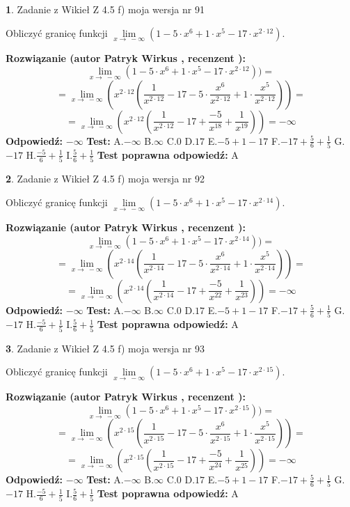 \documentclass[12pt, a4paper]{article}
\theoremstyle{definition} %
\newtheorem{zad}{}
\newcommand{\zadStart}[1]{\begin{zad}#1\newline}
\newcommand{\zadStop}{\end{zad}}
\newcommand{\rozwStart}[2]{\noindent \textbf{Rozwiązanie (autor #1 , recenzent #2): }\newline}
\newcommand{\rozwStop}{\newline}
\newcommand{\odpStart}{\noindent \textbf{Odpowiedź:}\newline}
\newcommand{\odpStop}{\newline}
\newcommand{\testStart}{\noindent \textbf{Test:}\newline}
\newcommand{\testStop}{\newline}
\newcommand{\kluczStart}{\noindent \textbf{Test poprawna odpowiedź:}\newline}
\newcommand{\kluczStop}{\newline}
\begin{document}
\zadStart{Zadanie z Wikieł Z 4.5 f) moja wersja nr 91}



Obliczyć granicę funkcji  $\lim\limits_{x\to\ -\infty}(1 - 5 \cdot x^{6}+1 \cdot x^{5}- 17 \cdot x^{2\cdot12})$.
\zadStop
\rozwStart{Patryk Wirkus}{}
$$\lim\limits_{x\to\ -\infty}(1 - 5 \cdot x^{6}+1 \cdot x^{5}- 17 \cdot x^{2\cdot12}))=$$
$$=\lim\limits_{x\to\ -\infty}(x^{2\cdot12}(\frac{1}{x^{2\cdot12}}-17 -5 \cdot \frac{x^{6}}{x^{2\cdot12}}+1 \cdot \frac{x^{5}}{x^{2\cdot12}}))=$$
$$=\lim\limits_{x\to\ -\infty}(x^{2\cdot12}(\frac{1}{x^{2\cdot12}}-17 + \frac{-5}{x^{18}}+ \frac{1}{x^{19}}))=-\infty$$
\rozwStop
\odpStart
$-\infty$
\odpStop
\testStart
A.$-\infty$ B.$\infty$ C.$0$ D.$17$ E.$-5 + 1 - 17$
F.$-17+\frac{5}{6}+\frac{1}{5}$ G.$-17$
H.$\frac{-5}{6}+\frac{1}{5}$
I.$\frac{5}{6}+\frac{1}{5}$
\testStop
\kluczStart
A
\kluczStop



\zadStart{Zadanie z Wikieł Z 4.5 f) moja wersja nr 92}



Obliczyć granicę funkcji  $\lim\limits_{x\to\ -\infty}(1 - 5 \cdot x^{6}+1 \cdot x^{5}- 17 \cdot x^{2\cdot14})$.
\zadStop
\rozwStart{Patryk Wirkus}{}
$$\lim\limits_{x\to\ -\infty}(1 - 5 \cdot x^{6}+1 \cdot x^{5}- 17 \cdot x^{2\cdot14}))=$$
$$=\lim\limits_{x\to\ -\infty}(x^{2\cdot14}(\frac{1}{x^{2\cdot14}}-17 -5 \cdot \frac{x^{6}}{x^{2\cdot14}}+1 \cdot \frac{x^{5}}{x^{2\cdot14}}))=$$
$$=\lim\limits_{x\to\ -\infty}(x^{2\cdot14}(\frac{1}{x^{2\cdot14}}-17 + \frac{-5}{x^{22}}+ \frac{1}{x^{23}}))=-\infty$$
\rozwStop
\odpStart
$-\infty$
\odpStop
\testStart
A.$-\infty$ B.$\infty$ C.$0$ D.$17$ E.$-5 + 1 - 17$
F.$-17+\frac{5}{6}+\frac{1}{5}$ G.$-17$
H.$\frac{-5}{6}+\frac{1}{5}$
I.$\frac{5}{6}+\frac{1}{5}$
\testStop
\kluczStart
A
\kluczStop



\zadStart{Zadanie z Wikieł Z 4.5 f) moja wersja nr 93}



Obliczyć granicę funkcji  $\lim\limits_{x\to\ -\infty}(1 - 5 \cdot x^{6}+1 \cdot x^{5}- 17 \cdot x^{2\cdot15})$.
\zadStop
\rozwStart{Patryk Wirkus}{}
$$\lim\limits_{x\to\ -\infty}(1 - 5 \cdot x^{6}+1 \cdot x^{5}- 17 \cdot x^{2\cdot15}))=$$
$$=\lim\limits_{x\to\ -\infty}(x^{2\cdot15}(\frac{1}{x^{2\cdot15}}-17 -5 \cdot \frac{x^{6}}{x^{2\cdot15}}+1 \cdot \frac{x^{5}}{x^{2\cdot15}}))=$$
$$=\lim\limits_{x\to\ -\infty}(x^{2\cdot15}(\frac{1}{x^{2\cdot15}}-17 + \frac{-5}{x^{24}}+ \frac{1}{x^{25}}))=-\infty$$
\rozwStop
\odpStart
$-\infty$
\odpStop
\testStart
A.$-\infty$ B.$\infty$ C.$0$ D.$17$ E.$-5 + 1 - 17$
F.$-17+\frac{5}{6}+\frac{1}{5}$ G.$-17$
H.$\frac{-5}{6}+\frac{1}{5}$
I.$\frac{5}{6}+\frac{1}{5}$
\testStop
\kluczStart
A
\kluczStop
\end{document}
